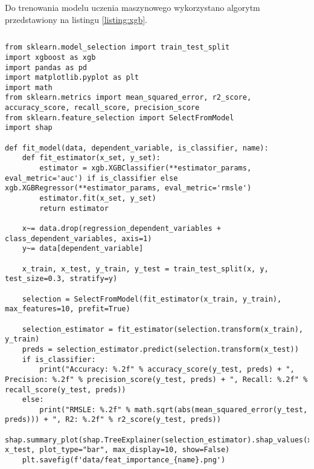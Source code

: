 Do trenowania modelu uczenia maszynowego wykorzystano algorytm przedstawiony na listingu \ref{listing:xgb}.


\noindent\begin{minipage}{\textwidth}
             \begin{lstlisting}[caption={Algorytm uczenia modelu regresji}, label={listing:xgb}]
             \end{lstlisting}
             \hspace{.075\textwidth}\begin{minipage}{.85\textwidth}
                                        \begin{verbatim}
from sklearn.model_selection import train_test_split
import xgboost as xgb
import pandas as pd
import matplotlib.pyplot as plt
import math
from sklearn.metrics import mean_squared_error, r2_score, accuracy_score, recall_score, precision_score
from sklearn.feature_selection import SelectFromModel
import shap

def fit_model(data, dependent_variable, is_classifier, name):
    def fit_estimator(x_set, y_set):
        estimator = xgb.XGBClassifier(**estimator_params, eval_metric='auc') if is_classifier else xgb.XGBRegressor(**estimator_params, eval_metric='rmsle')
        estimator.fit(x_set, y_set)
        return estimator

    x~= data.drop(regression_dependent_variables + class_dependent_variables, axis=1)
    y~= data[dependent_variable]

    x_train, x_test, y_train, y_test = train_test_split(x, y, test_size=0.3, stratify=y)

    selection = SelectFromModel(fit_estimator(x_train, y_train), max_features=10, prefit=True)

    selection_estimator = fit_estimator(selection.transform(x_train), y_train)
    preds = selection_estimator.predict(selection.transform(x_test))
    if is_classifier:
        print("Accuracy: %.2f" % accuracy_score(y_test, preds) + ", Precision: %.2f" % precision_score(y_test, preds) + ", Recall: %.2f" % recall_score(y_test, preds))
    else:
        print("RMSLE: %.2f" % math.sqrt(abs(mean_squared_error(y_test, preds))) + ", R2: %.2f" % r2_score(y_test, preds))
    shap.summary_plot(shap.TreeExplainer(selection_estimator).shap_values(x_test), x_test, plot_type="bar", max_display=10, show=False)
    plt.savefig(f'data/feat_importance_{name}.png')
                                        \end{verbatim}
             \end{minipage}

             \raggedright\source{\ownwork}
             \vspace{0.75cm}
\end{minipage}

